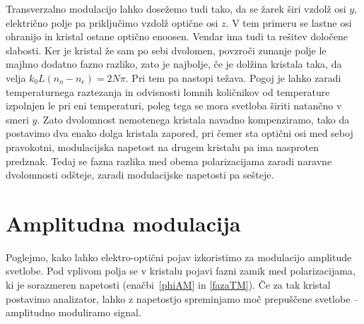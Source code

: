 \begin{remark}
Transverzalno modulacijo lahko dosežemo tudi tako, da se žarek širi vzdolž 
osi $y$, električno polje pa priključimo vzdolž optične osi $z$.
V tem primeru se lastne osi ohranijo in kristal ostane optično enoosen. Vendar 
 ima tudi ta rešitev določene slabosti. Ker je kristal že sam po sebi dvolomen, 
povzroči zunanje polje le majhno dodatno fazno razliko, zato je najbolje, če je dolžina 
kristala taka, da velja $k_{0}L(n_{o}-n_{e})=2N\pi$. Pri tem pa nastopi težava. 
Pogoj je lahko zaradi temperaturnega raztezanja in odvisnosti lomnih količnikov od temperature
izpolnjen le pri eni temperaturi, poleg tega se mora svetloba širiti natančno v smeri $y$.
Zato dvolomnost nemotenega kristala navadno kompenziramo, tako da postavimo 
dva enako dolga kristala zapored, pri čemer sta optični
osi med seboj pravokotni, modulacijska napetost na drugem kristalu pa ima
nasproten predznak. Tedaj se fazna razlika med obema polarizacijama zaradi 
naravne dvolomnosti odšteje, zaradi modulacijske napetosti pa sešteje.
\end{remark}

\section{Amplitudna modulacija}
\label{chap:ampmod}
Poglejmo, kako lahko elektro-optični pojav izkoristimo za modulacijo
amplitude svetlobe. Pod vplivom polja se v kristalu pojavi
fazni zamik med polarizacijama, ki je sorazmeren napetosti 
(enačbi~\ref{phiAM} in \ref{fazaTM}).
Če za tak kristal postavimo analizator, lahko z napetostjo spreminjamo 
moč prepuščene svetlobe -- amplitudno moduliramo signal.

